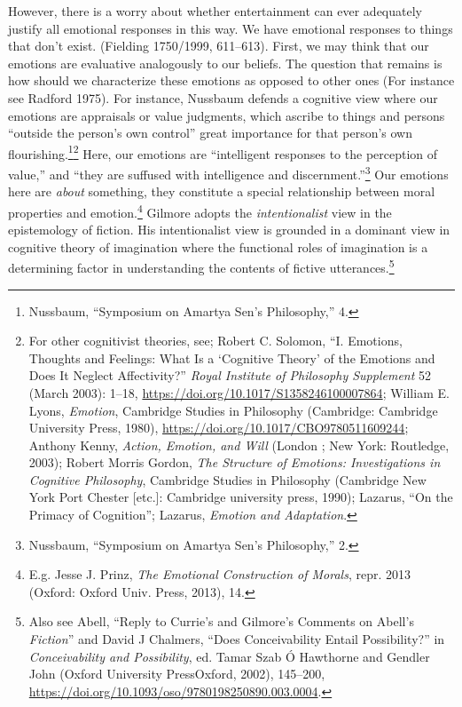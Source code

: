 \documentclass[phdthesis,12pt,final,a4paper]{wuthesis}
\theoremstyle{definition}
\theoremstyle{definition}
\theoremstyle{definition}
\theoremstyle{definition}
\theoremstyle{remark}
\begin{document}
However, there is a worry about whether entertainment can ever adequately justify all emotional responses in this way. We have emotional responses to things that don't exist. (Fielding 1750/1999, 611--613). First, we may think that our emotions are evaluative analogously to our beliefs. The question that remains is how should we characterize these emotions as opposed to other ones (For instance see Radford 1975). For instance, Nussbaum defends a cognitive view where our emotions are appraisals or value judgments, which ascribe to things and persons ``outside the person's own control'' great importance for that person's own flourishing.\footnote{Nussbaum, {``Symposium on {Amartya Sen}'s Philosophy,''} 4.}\footnote{For other cognitivist theories, see; Robert C. Solomon, {``I. {Emotions}, {Thoughts} and {Feelings}: {What} Is a {`{Cognitive Theory}'} of the {Emotions} and {Does} It {Neglect Affectivity}?''} \emph{Royal Institute of Philosophy Supplement} 52 (March 2003): 1--18, \url{https://doi.org/10.1017/S1358246100007864}; William E. Lyons, \emph{Emotion}, Cambridge Studies in Philosophy (Cambridge: Cambridge University Press, 1980), \url{https://doi.org/10.1017/CBO9780511609244}; Anthony Kenny, \emph{Action, Emotion, and Will} (London ; New York: Routledge, 2003); Robert Morris Gordon, \emph{The Structure of Emotions: Investigations in Cognitive Philosophy}, Cambridge Studies in Philosophy (Cambridge New York Port Chester {[}etc.{]}: Cambridge university press, 1990); Lazarus, {``On the {Primacy} of {Cognition}''}; Lazarus, \emph{Emotion and Adaptation}.} Here, our emotions are ``intelligent responses to the perception of value,'' and ``they are suffused with intelligence and discernment.''\footnote{Nussbaum, {``Symposium on {Amartya Sen}'s Philosophy,''} 2.} Our emotions here are \emph{about} something, they constitute a special relationship between moral properties and emotion.\footnote{E.g. Jesse J. Prinz, \emph{The {Emotional Construction} of {Morals}}, repr. 2013 (Oxford: Oxford Univ. Press, 2013), 14.} Gilmore adopts the \emph{intentionalist} view in the epistemology of fiction. His intentionalist view is grounded in a dominant view in cognitive theory of imagination where the functional roles of imagination is a determining factor in understanding the contents of fictive utterances.\footnote{Also see Abell, {``Reply to {Currie}'s and {Gilmore}'s Comments on {Abell}'s {\emph{Fiction}}''} and David J Chalmers, {``Does {Conceivability Entail Possibility}?''} in \emph{Conceivability and {Possibility}}, ed. Tamar Szab Ó Hawthorne and Gendler John (Oxford University PressOxford, 2002), 145--200, \url{https://doi.org/10.1093/oso/9780198250890.003.0004}.}
\end{document}
